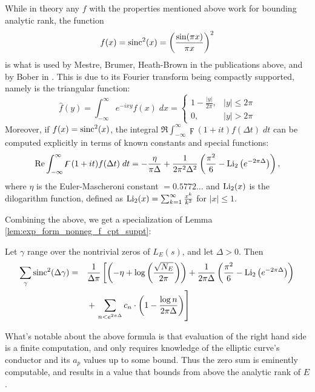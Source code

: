 While in theory any $f$ with the properties mentioned above work for bounding analytic rank, the function
\begin{equation}
f(x) = \operatorname{sinc}^2(x) = \left(\frac{\sin(\pi x)}{\pi x}\right)^2
\end{equation}
is what is used by Mestre, Brumer, Heath-Brown in the publications above, and by Bober in \cite{Bob-2011}. This is due to its Fourier transform being compactly supported, namely is the triangular function:
\begin{equation}
\hat{f}(y) = \int_{-\infty}^{\infty} e^{-i x y}f(x)\; dx =  \begin{cases} 1 - \frac{|y|}{2\pi}, & |y|\le 2\pi \\ 0, & |y| > 2\pi\end{cases}
\end{equation}
Moreover, if $f(x) = \operatorname{sinc}^2(x)$, the integral $\Re\int_{-\infty}^{\infty} \digamma(1+it)f(\Delta t) \; dt$ can be computed explicitly in terms of known constants and special functions:
\begin{equation}
\mbox{\rm Re}\int_{-\infty}^{\infty} \digamma(1+it)f(\Delta t) \; dt = - \frac{\eta}{\pi \Delta} + \frac{1}{2\pi^2 \Delta^2}\left(\frac{\pi^2}{6} - \operatorname{Li}_2\left(e^{-2\pi \Delta}\right)\right),
\end{equation}
where $\eta$ is the Euler-Mascheroni constant $= 0.5772\ldots$ and $\operatorname{Li}_2(x)$ is the dilogarithm function, defined as $\operatorname{Li}_2(x) = \sum_{k=1}^{\infty} \frac{x^k}{k^2}$ for $|x|\le 1$.

Combining the above, we get a specialization of Lemma \ref{lem:exp_form_nonneg_f_cpt_suppt}:
\begin{corollary}[GRH]
Let $\gamma$ range over the nontrivial zeros of $L_E(s)$, and let $\Delta > 0$. Then
\begin{align}\label{eqn:sincsquared_sum}
\sum_{\gamma} \operatorname{sinc}^2(\Delta \gamma) = \quad &\frac{1}{\Delta \pi}\left[\left(-\eta + \log\left(\frac{\sqrt{N_E}}{2\pi}\right)\right)+ \frac{1}{2\pi \Delta}\left(\frac{\pi^2}{6} - \operatorname{Li}_2\left(e^{-2\pi \Delta}\right)\right)  \right. \nonumber \\
&+ \left.\sum_{n<e^{2\pi \Delta}} c_n \cdot \left(1-\frac{\log n}{2\pi \Delta}\right)\right]
\end{align}
\end{corollary}

What's notable about the above formula is that evaluation of the right hand side is a finite computation, and only requires knowledge of the elliptic curve's conductor and its $a_p$ values up to some bound. Thus the zero sum is eminently computable, and results in a value that bounds from above the analytic rank of $E$. \\

